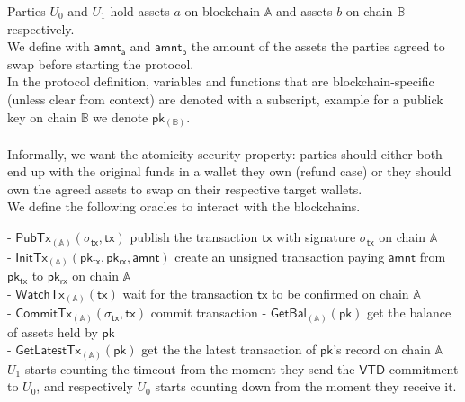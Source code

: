 \documentclass{article}      	%
\begin{document}

Parties $U_0$ and $U_1$ hold assets $a$ on blockchain $\mathbb{A}$ and assets $b$ on chain $\mathbb{B}$ respectively. \\
We define with $\mathsf{amnt_a}$ and $\mathsf{amnt_b}$ the amount of the assets the parties agreed to swap before starting the protocol. \\
In the protocol definition, variables and functions that are blockchain-specific (unless clear from context) are denoted with a subscript, example for a publick key on chain $\mathbb{B}$ we denote $\mathsf{pk_{(\mathbb{B})}}$. \\
\\

Informally, we want the atomicity security property: parties should either both end up with the original funds in a wallet they own (refund case) or they should own the agreed assets to swap on their respective target wallets. \\

We define the following oracles to interact with the blockchains.

- $\mathsf{PubTx}_{(\mathbb{A})}(\sigma_{\mathsf{tx}}, \mathsf{tx})$ publish the transaction $\mathsf{tx}$ with signature $\sigma_{\mathsf{tx}}$ on chain $\mathbb{A}$ \\
- $\mathsf{InitTx}_{(\mathbb{A})}(\mathsf{pk_{tx}}, \mathsf{pk_{rx}}, \mathsf{amnt})$ create an unsigned transaction paying $\mathsf{amnt}$ from $\mathsf{pk_{tx}}$ to $\mathsf{pk_{rx}}$ on chain $\mathbb{A}$ \\
- $\mathsf{WatchTx}_{(\mathbb{A})}(\mathsf{tx})$ wait for the transaction $\mathsf{tx}$ to be confirmed on chain $\mathbb{A}$ \\
- $\mathsf{CommitTx}_{(\mathbb{A})}(\sigma_{\mathsf{tx}}, \mathsf{tx})$ commit transaction
- $\mathsf{GetBal}_{(\mathbb{A})}(\mathsf{pk})$ get the balance of assets held by $\mathsf{pk}$ \\
- $\mathsf{GetLatestTx}_{(\mathbb{A})}(\mathsf{pk})$ get the the latest transaction of $\mathsf{pk}$'s record on chain $\mathbb{A}$ \\

$U_1$ starts counting the timeout from the moment they send the $\mathsf{VTD}$ commitment to $U_0$, and respectively $U_0$ starts counting down from the moment they receive it. \\
\\
\end{document}
